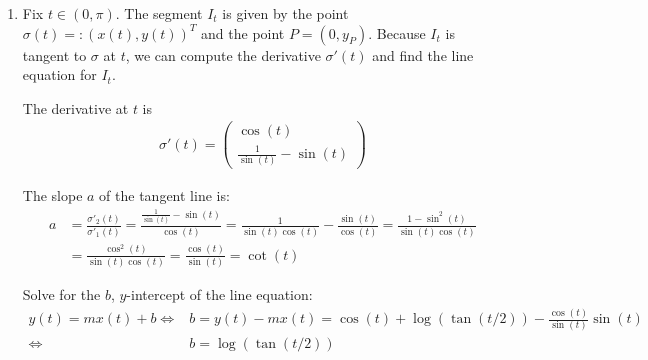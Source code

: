 \documentclass[12pt]{article}
\begin{document}
\begin{enumerate}
    Use the substitution $u = \sin(t),\ \dd u = \cos(t) \dd t$:
    \begin{align*}
        L(\sigma|_{[\eps, \pi/2]}) &= \int_{\sin(\eps)}^{1} \frac{1}{u}\dd u = \big[\log(u)\big]_{\sin(\eps)}^1 = \log(1) - \log(\sin(\eps)) \\
        &= \boxed{- \log(\sin(\eps))}
    \end{align*}

    What happens as $\eps \rightarrow 0+$? Note that as $\eps \rightarrow 0^+$, we have $\sin(\eps) \approx \eps$ by the Taylor expansion of $\sin$ at 0. So we have
    \begin{align*}
        \lim_{\eps \rightarrow 0^+} L(\sigma|_{[\eps, \pi/2]}) &= -\lim_{\eps \rightarrow 0^+} \log(\sin(\eps)) = -\lim_{\eps \rightarrow 0^+} \log(\eps) = -(-\infty) = \infty
    \end{align*}

    \item Fix $t \in (0, \pi)$. The segment $I_t$ is given by the point $\sigma(t) =: (x(t), y(t))^T$ and the point $P = (0, y_P)$. Because $I_t$ is tangent to $\sigma$ at $t$, we can compute the derivative $\sigma'(t)$ and find the line equation for $I_t$.
    
    The derivative at $t$ is
    \begin{align*}
        \sigma'(t) =
        \begin{pmatrix}
            \cos(t) \\
            \frac{1}{\sin(t)} - \sin(t)
        \end{pmatrix}
    \end{align*}

    The slope $a$ of the tangent line is:
    \begin{align*}
        a &= \frac{\sigma'_2(t)}{\sigma'_1(t)} = \frac{\frac{1}{\sin(t)} - \sin(t)}{\cos(t)} = \frac{1}{\sin(t)\cos(t)} - \frac{\sin(t)}{\cos(t)} = \frac{1 - \sin^2(t)}{\sin(t)\cos(t)} \\
        &= \frac{\cos^2(t)}{\sin(t)\cos(t)} = \frac{\cos(t)}{\sin(t)} = \cot(t)
    \end{align*}

    Solve for the $b$, $y$-intercept of the line equation:
    \begin{align*}
        y(t) = mx(t) + b \iff &b = y(t)-mx(t) = \cos(t) + \log(\tan(t/2)) - \frac{\cos(t)}{\sin(t)} \sin(t) \\
        \iff &b = \log(\tan(t/2))
    \end{align*}


\end{enumerate}
\end{document}
